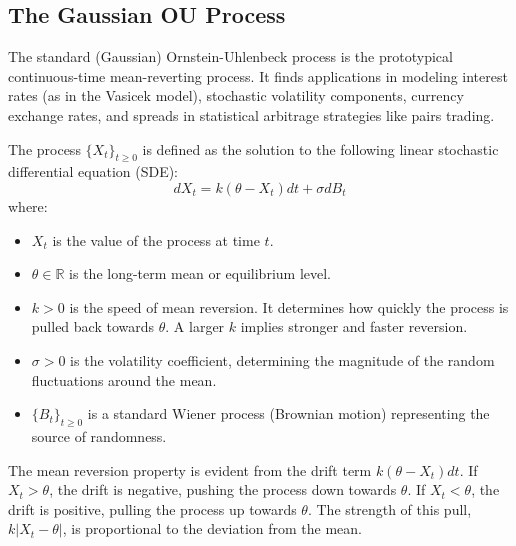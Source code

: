 \documentclass[11pt,twoside,openright]{report}
\begin{document}

\subsection{The Gaussian OU Process}
\label{subsec:gaussian_ou}

The standard (Gaussian) Ornstein-Uhlenbeck process is the prototypical continuous-time mean-reverting process. It finds applications in modeling interest rates (as in the Vasicek model), stochastic volatility components, currency exchange rates, and spreads in statistical arbitrage strategies like pairs trading.

The process $\{X_t\}_{t \ge 0}$ is defined as the solution to the following linear stochastic differential equation (SDE):
\[ dX_t = k (\theta - X_t) dt + \sigma dB_t \]
where:
\begin{itemize}
    \item $X_t$ is the value of the process at time $t$.
    \item $\theta \in \mathbb{R}$ is the long-term mean or equilibrium level.
    \item $k > 0$ is the speed of mean reversion. It determines how quickly the process is pulled back towards $\theta$. A larger $k$ implies stronger and faster reversion.
    \item $\sigma > 0$ is the volatility coefficient, determining the magnitude of the random fluctuations around the mean.
    \item $\{B_t\}_{t \ge 0}$ is a standard Wiener process (Brownian motion) representing the source of randomness.
\end{itemize}
The mean reversion property is evident from the drift term $k (\theta - X_t) dt$. If $X_t > \theta$, the drift is negative, pushing the process down towards $\theta$. If $X_t < \theta$, the drift is positive, pulling the process up towards $\theta$. The strength of this pull, $k |X_t - \theta|$, is proportional to the deviation from the mean.
\end{document}
